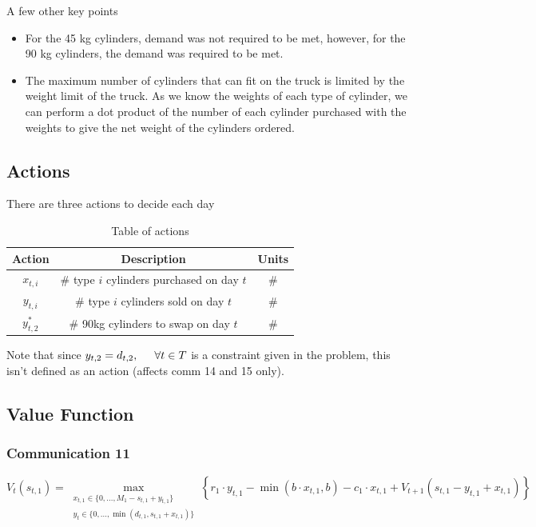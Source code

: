 \documentclass{article}
\begin{document}
\bigskip
\noindent
A few other key points
\begin{itemize}
    \item For the 45 kg cylinders, demand was not required to be met, however, for the 90 kg cylinders, the demand was required to be met.
    \item The maximum number of cylinders that can fit on the truck is limited by the weight limit of the truck. As we know the weights of each type of cylinder, we can perform a dot product of the number of each cylinder purchased with the weights to give the net weight of the cylinders ordered.
    
\end{itemize}

\bigskip
\newpage
\subsection{Actions}

There are three actions to decide each day

\renewcommand\baselinestretch{1.5}
\begin{table}[htb]
    \centering
    \color{black}
    \begin{tabular}{|c:c:c|}
        \hline
        \textbf{Action} & \textbf{Description} & \textbf{Units} \\
        \hline
        $x_{t,i}$ & \# type $i$ cylinders purchased on day $t$ & \# \\ \hdashline
        $y_{t,i}$ & \# type $i$ cylinders sold on day $t$ & \# \\ \hdashline
        $y_{t,2}^*$ & \# 90kg cylinders to swap on day $t$ &  \# \\
        \hline
    \end{tabular}
    \caption{Table of actions}
    \label{tab:actions}
\end{table}
\renewcommand\baselinestretch{1}

Note that since $y_{t,2} = d_{t,2}, \hspace{0.5cm} \forall t \in T$ is a constraint given in the problem, this isn't defined as an action (affects comm 14 and 15 only).

\bigskip
\subsection{Value Function}
\subsubsection{Communication 11}
$$V_t(s_{t,1}) = \underset{\substack{    x_{t,1} \in \{0,...,M_1 - s_{t,1} + y_{t,1}\} \\    y_t \in \{0,...,\min(d_{t,1}, s_{t,1} + x_{t,1})\} }}{\max} \left\{r_1 \cdot y_{t,1} - \min(b \cdot x_{t,1}, b) - c_1\cdot x_{t,1} + V_{t+1}(s_{t,1}-y_{t,1}+x_{t,1}) \right\} $$
\end{document}
